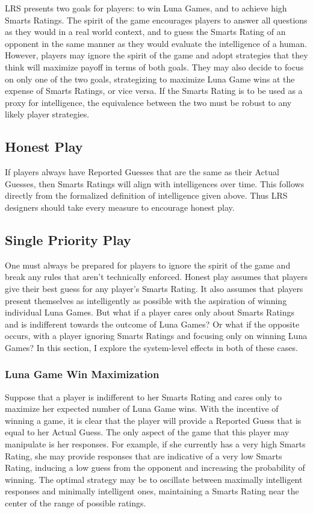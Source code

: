 LRS presents two goals for players: to win Luna Games, and to achieve high Smarts Ratings. The spirit of the game encourages players to answer all questions as they would in a real world context, and to guess the Smarts Rating of an opponent in the same manner as they would evaluate the intelligence of a human. However, players may ignore the spirit of the game and adopt strategies that they think will maximize payoff in terms of both goals. They may also decide to focus on only one of the two goals, strategizing to maximize Luna Game wins at the expense of Smarts Ratings, or vice versa. If the Smarts Rating is to be used as a proxy for intelligence, the equivalence between the two must be robust to any likely player strategies.

\subsection{Honest Play}

If players always have Reported Guesses that are the same as their Actual Guesses, then Smarts Ratings will align with intelligences over time. This follows directly from the formalized definition of intelligence given above. Thus LRS designers should take every measure to encourage honest play.

\subsection{Single Priority Play}

One must always be prepared for players to ignore the spirit of the game and break any rules that aren't technically enforced. Honest play assumes that players give their best guess for any player's Smarts Rating. It also assumes that players present themselves as intelligently as possible with the aspiration of winning individual Luna Games. But what if a player cares only about Smarts Ratings and is indifferent towards the outcome of Luna Games? Or what if the opposite occurs, with a player ignoring Smarts Ratings and focusing only on winning Luna Games? In this section, I explore the system-level effects in both of these cases.

\subsubsection{Luna Game Win Maximization}

Suppose that a player is indifferent to her Smarts Rating and cares only to maximize her expected number of Luna Game wins. With the incentive of winning a game, it is clear that the player will provide a Reported Guess that is equal to her Actual Guess. The only aspect of the game that this player may manipulate is her responses. For example, if she currently has a very high Smarts Rating, she may provide responses that are indicative of a very low Smarts Rating, inducing a low guess from the opponent and increasing the probability of winning. The optimal strategy may be to oscillate between maximally intelligent responses and minimally intelligent ones, maintaining a Smarts Rating near the center of the range of possible ratings. 

